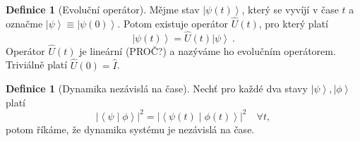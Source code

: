 \documentclass[10pt,a4paper]{article}
\theoremstyle{definition}
\newtheorem{definition}[theorem]{Definice}
\newcommand{\abs}[1]{\left| #1 \right|}
\newcommand{\ket}[1]{\left| #1 \right>}
\newcommand{\braket}[2]{\left< #1 \middle| #2 \right>}
\def\1{\hat{I}}
\begin{document}
\begin{definition}[Evoluční operátor]
    Mějme stav $\ket{\psi(t)}$, který se vyvíjí v čase $t$ a označme $\ket{\psi} \equiv \ket{\psi(0)}$. Potom existuje operátor $\hat{U}(t)$, pro který platí $$\ket{\psi(t)} = \hat{U}(t) \ket{\psi} \: .$$ Operátor $\hat{U}(t)$ je lineární (PROČ?) a nazýváme ho evolučním operátorem. Triviálně platí $\hat{U}(0) = \1$.
\end{definition}

\begin{definition}[Dynamika nezávislá na čase]
    Nechť pro každé dva stavy $\ket{\psi}, \ket{\phi}$ platí $$\abs{\braket{\psi}{\phi}}^2 = \abs{\braket{\psi(t)}{\phi(t)}}^2 \quad \forall t,$$ potom říkáme, že dynamika systému je nezávislá na čase.
\end{definition}
\end{document}
